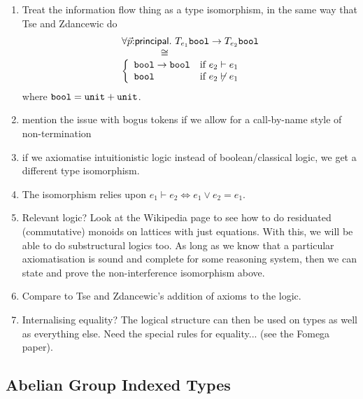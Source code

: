 \begin{enumerate}
\item Treat the information flow thing as a type isomorphism, in the
  same way that Tse and Zdancewic do
  \begin{displaymath}
    \begin{array}{l}
    \forall \vec{p}\mathord:\mathsf{principal}.\ T_{e_1}\texttt{bool} \to T_{e_2}\texttt{bool}\\
    \hspace{4em}\cong \\
    \left\{
      \begin{array}{ll}
        \texttt{bool} \to \texttt{bool} & \textrm{if }e_2 \vdash e_1 \\
        \texttt{bool} & \textrm{if }e_2 \not\vdash e_1
      \end{array}
    \right.
  \end{array}
  \end{displaymath}
  where $\texttt{bool} = \texttt{unit} + \texttt{unit}$.
\item mention the issue with bogus tokens if we allow for a
  call-by-name style of non-termination
\item if we axiomatise intuitionistic logic instead of
  boolean/classical logic, we get a different type isomorphism.
\item The isomorphism relies upon $e_1 \vdash e_2 \Leftrightarrow e_1
  \lor e_2 = e_1$.
\item Relevant logic? Look at the Wikipedia page to see how to do
  residuated (commutative) monoids on lattices with just
  equations. With this, we will be able to do substructural logics
  too. As long as we know that a particular axiomatisation is sound
  and complete for some reasoning system, then we can state and prove
  the non-interference isomorphism above.
\item Compare to Tse and Zdancewic's addition of axioms to the logic.
\item Internalising equality? The logical structure can then be used
  on types as well as everything else. Need the special rules for
  equality... (see the Fomega paper).
\end{enumerate}


\subsection{Abelian Group Indexed Types}
\label{sec:abelian-group-indexed-types}

